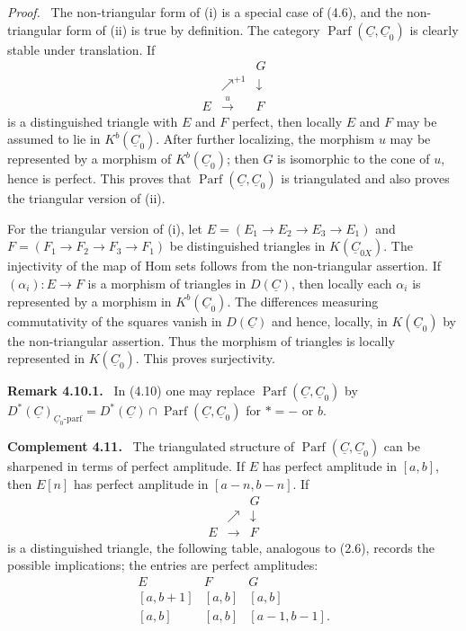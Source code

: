 \documentclass[13pt]{extarticle}
\newcommand{\uC}{\underline C}
\newcommand{\Parf}{\operatorname{Parf}}
\newenvironment{statement}[1]{\par\medskip\noindent\textbf{#1.}\ }{\par\medskip}
\newenvironment{prooftext}[1][Proof]{\par\noindent\emph{#1.}\ }{\par\medskip}
\newenvironment{remarktext}[1][Remark]{\par\noindent\textbf{#1.}\ }{\par\medskip}
\begin{document}
\begin{prooftext}
The non-triangular form of (i) is a special case of (4.6), and the non-triangular form of (ii) is true by definition. The category $\Parf(\uC,\uC_0)$ is clearly stable under translation. If
\[
\begin{array}{ccc}
&&G\\
&\nearrow^{+1}&\downarrow\\
E&\xrightarrow{u}&F
\end{array}
\]
is a distinguished triangle with $E$ and $F$ perfect, then locally $E$ and $F$ may be assumed to lie in $K^b(\uC_0)$. After further localizing, the morphism $u$ may be represented by a morphism of $K^b(\uC_0)$; then $G$ is isomorphic to the cone of $u$, hence is perfect. This proves that $\Parf(\uC,\uC_0)$ is triangulated and also proves the triangular version of (ii).

For the triangular version of (i), let $E=(E_1\to E_2\to E_3\to E_1)$ and $F=(F_1\to F_2\to F_3\to F_1)$ be distinguished triangles in $K(\uC_{0X})$. The injectivity of the map of Hom sets follows from the non-triangular assertion. If $(\alpha_i):E\to F$ is a morphism of triangles in $D(\uC)$, then locally each $\alpha_i$ is represented by a morphism in $K^b(\uC_0)$. The differences measuring commutativity of the squares vanish in $D(\uC)$ and hence, locally, in $K(\uC_0)$ by the non-triangular assertion. Thus the morphism of triangles is locally represented in $K(\uC_0)$. This proves surjectivity.
\end{prooftext}

\begin{remarktext}[Remark 4.10.1]
In (4.10) one may replace $\Parf(\uC,\uC_0)$ by $D^*(\uC)_{\uC_0\text{-parf}}=D^*(\uC)\cap\Parf(\uC,\uC_0)$ for $*=-$ or $b$.
\end{remarktext}

\begin{statement}{Complement 4.11}
The triangulated structure of $\Parf(\uC,\uC_0)$ can be sharpened in terms of perfect amplitude. If $E$ has perfect amplitude in $[a,b]$, then $E[n]$ has perfect amplitude in $[a-n,b-n]$. If
\[
\begin{array}{ccc}
&&G\\
&\nearrow&\downarrow\\
E&\longrightarrow&F
\end{array}
\]
is a distinguished triangle, the following table, analogous to (2.6), records the possible implications; the entries are perfect amplitudes:
\[
\begin{array}{ccc}
E&F&G\\
{}[a,b+1]&[a,b]&[a,b]\\
{}[a,b]&[a,b]&[a-1,b-1].
\end{array}
\]
\end{statement}
\end{document}
